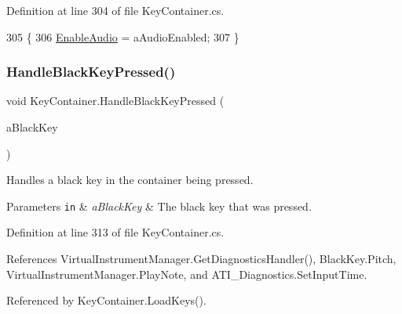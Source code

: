 Definition at line 304 of file Key\+Container.\+cs.


\begin{DoxyCode}
305     \{
306         \hyperlink{group___key_contain_pub_var_ga5dc9b1349f8fafc894c7f739f6780a8c}{EnableAudio} = aAudioEnabled;
307     \}
\end{DoxyCode}
\mbox{\label{group___key_contain_event_handlers_ga05cc2543fd9772b26e27bf4f6247ab47}} 
\subsubsection{\texorpdfstring{Handle\+Black\+Key\+Pressed()}{HandleBlackKeyPressed()}}
{\footnotesize\ttfamily void Key\+Container.\+Handle\+Black\+Key\+Pressed (\begin{DoxyParamCaption}\item[{\hyperlink{class_black_key}{Black\+Key}}]{a\+Black\+Key }\end{DoxyParamCaption})\hspace{0.3cm}{\ttfamily [private]}}



Handles a black key in the container being pressed. 


\begin{DoxyParams}[1]{Parameters}
\mbox{\tt in}  & {\em a\+Black\+Key} & The black key that was pressed. \\
\hline
\end{DoxyParams}


Definition at line 313 of file Key\+Container.\+cs.



References Virtual\+Instrument\+Manager.\+Get\+Diagnostics\+Handler(), Black\+Key.\+Pitch, Virtual\+Instrument\+Manager.\+Play\+Note, and A\+T\+I\+\_\+\+Diagnostics.\+Set\+Input\+Time.



Referenced by Key\+Container.\+Load\+Keys().


